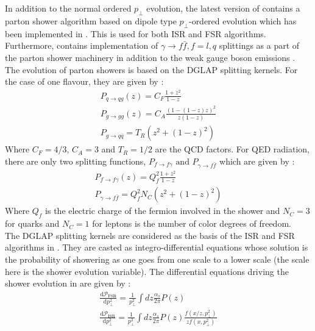 \section{\Pythia}
\label{sec:psunc:tools:pythia}
In addition to the normal ordered $p_\perp$ evolution, the latest version of \Pythia \quad 
contains a parton shower algorithm based on dipole type $p_\perp$-ordered evolution 
which has been implemented in  \cite{Sjostrand:2004ef}. This is used for both 
ISR and FSR algorithms. Furthermore,  \cite{Sjostrand:2007gs,Sjostrand:2014zea}
contains implementation of $\gamma \to f \bar{f}, f=l,q$ splittings as a part of the 
parton shower machinery in addition to the weak gauge boson emissions \cite{Christiansen:2014kba}. \\
The evolution of parton showers is based on the DGLAP splitting kernels. For the case of one flavour, they are
given by :
\begin{eqnarray}
 P_{q \to q g} (z) = C_F \frac{1 + z^2}{1 - z} \\
 P_{g \to g g} (z) = C_A \frac{(1 - (1 - z) z)^2}{z (1-z)} \\
 P_{g \to q \bar{q}} = T_R (z^2 + (1 - z)^2)
\end{eqnarray}
Where $C_F = 4/3$, $C_A = 3$ and $T_R=1/2$ are the QCD factors. For QED radiation, there are only 
two splitting functions, $P_{f\to f \gamma} \text{ and } P_{\gamma \to f\bar{f}}$ which are given by :
\begin{eqnarray}
 P_{f \to f \gamma} (z) = Q_f^2 \frac{1 + z^2}{1 - z} \\
 P_{\gamma \to f \bar{f}} = Q_f^2 N_C (z^2 + (1 - z)^2)
\end{eqnarray}
Where $Q_f$ is the electric charge of the fermion involved in the shower 
and $N_C = 3$ for quarks and $N_C=1$ for leptons is the number of color degrees 
of freedom. \\
The DGLAP splitting kernels are considered as the basis of the ISR and FSR algorithms
in \Pythia. They are casted as integro-differential equations whose solution
is the probability of showering as one goes from one scale to a lower scale (the scale here 
is the shower evolution variable). The differential equations driving the shower evolution 
in \Pythia \quad are given by :
\begin{eqnarray}
 \frac{\text{d} \mathcal{P}_{\text{FSR}}}{\text{d} p_\perp^2} = \frac{1}{p_\perp^2} \int dz \frac{\alpha_s}{2 \pi} P(z) \\
 \frac{\text{d} \mathcal{P}_{\text{ISR}}}{\text{d} p_\perp^2} = \frac{1}{p_\perp^2} \int dz \frac{\alpha_s}{2 \pi} P(z) 
 \frac{f(x/z,p_\perp^2)}{z f(x,p_\perp^2)}
\end{eqnarray}
